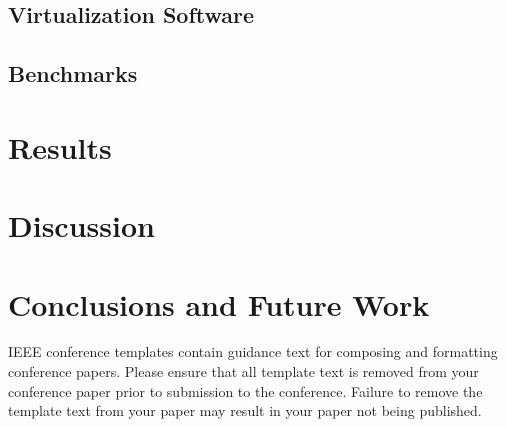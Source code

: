 \documentclass[conference]{IEEEtran}
\begin{document}
\subsection{Virtualization Software}\label{sec:virtspec}


\subsection{Benchmarks}\label{sec:benchspec}

\section{Results}\label{sec:results}

\section{Discussion}\label{sec:discussion}

\section{Conclusions and Future Work}\label{sec:conclusion}







\vspace{12pt}
\color{red}
IEEE conference templates contain guidance text for composing and formatting conference papers. Please ensure that all template text is removed from your conference paper prior to submission to the conference. Failure to remove the template text from your paper may result in your paper not being published.
\end{document}

